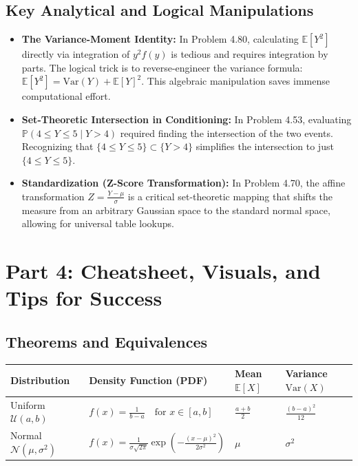 \documentclass[11pt, a4paper]{article}
\theoremstyle{definition}
\theoremstyle{remark}
\newcommand{\E}{\mathbb{E}}
\newcommand{\Prob}{\mathbb{P}}
\begin{document}
\subsection{Key Analytical and Logical Manipulations}
\begin{itemize}
    \item \textbf{The Variance-Moment Identity:} In Problem 4.80, calculating $\E[Y^2]$ directly via integration of $y^2 f(y)$ is tedious and requires integration by parts. The logical trick is to reverse-engineer the variance formula: $\E[Y^2] = \text{Var}(Y) + \E[Y]^2$. This algebraic manipulation saves immense computational effort.
    \item \textbf{Set-Theoretic Intersection in Conditioning:} In Problem 4.53, evaluating $\Prob(4 \le Y \le 5 \mid Y > 4)$ required finding the intersection of the two events. Recognizing that $\{4 \le Y \le 5\} \subset \{Y > 4\}$ simplifies the intersection to just $\{4 \le Y \le 5\}$.
    \item \textbf{Standardization (Z-Score Transformation):} In Problem 4.70, the affine transformation $Z = \frac{Y - \mu}{\sigma}$ is a critical set-theoretic mapping that shifts the measure from an arbitrary Gaussian space to the standard normal space, allowing for universal table lookups.
\end{itemize}

\newpage
\section{Part 4: Cheatsheet, Visuals, and Tips for Success}

\subsection{Theorems and Equivalences}
\begin{table}[htbp]
\centering
\renewcommand{\arraystretch}{1.8}
\begin{tabularx}{\textwidth}{l X X X}
\toprule
\textbf{Distribution} & \textbf{Density Function (PDF)} & \textbf{Mean} $\E[X]$ & \textbf{Variance} $\text{Var}(X)$ \\
\midrule
Uniform $\mathcal{U}(a,b)$ & $f(x) = \frac{1}{b-a} \quad \text{for } x \in [a,b]$ & $\frac{a+b}{2}$ & $\frac{(b-a)^2}{12}$ \\
Normal $\mathcal{N}(\mu,\sigma^2)$ & $f(x) = \frac{1}{\sigma\sqrt{2\pi}} \exp\left(-\frac{(x-\mu)^2}{2\sigma^2}\right)$ & $\mu$ & $\sigma^2$ \\
\bottomrule
\end{tabularx}
\end{table}
\end{document}

